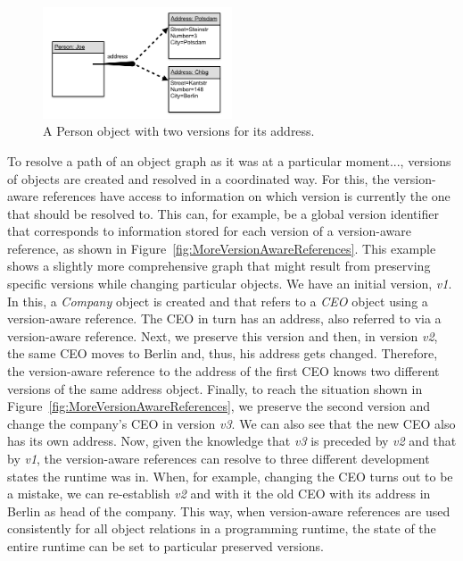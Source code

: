 \begin{figure}[h]
    \centering
    \includegraphics[width=0.5\textwidth]{figures/4_approach/versionAwareReference.png}
    \caption{A Person object with two versions for its address.}
    \label{fig:VersionAwareReference}
\end{figure}

To resolve a path of an object graph as it was at a particular moment..., versions of objects are created and resolved in a coordinated way.
For this, the version-aware references have access to information on which version is currently the one that should be resolved to.
This can, for example, be a global version identifier that corresponds to information stored for each version of a version-aware reference, as shown in Figure~\ref{fig:MoreVersionAwareReferences}.
This example shows a slightly more comprehensive graph that might result from preserving specific versions while changing particular objects.
We have an initial version, \emph{v1}.
In this, a \emph{Company} object is created and that refers to a \emph{CEO} object using a version-aware reference.
The CEO in turn has an address, also referred to via a version-aware reference.
Next, we preserve this version and then, in version \emph{v2}, the same CEO moves to Berlin and, thus, his address gets changed.
Therefore, the version-aware reference to the address of the first CEO knows two different versions of the same address object.
Finally, to reach the situation shown in Figure~\ref{fig:MoreVersionAwareReferences}, we preserve the second version and change the company's CEO in version \emph{v3}.
We can also see that the new CEO also has its own address.
Now, given the knowledge that \emph{v3} is preceded by \emph{v2} and that by \emph{v1}, the version-aware references can resolve to three different development states the runtime was in.
When, for example, changing the CEO turns out to be a mistake, we can re-establish \emph{v2} and with it the old CEO with its address in Berlin as head of the company.
This way, when version-aware references are used consistently for all object relations in a programming runtime, the state of the entire runtime can be set to particular preserved versions.

